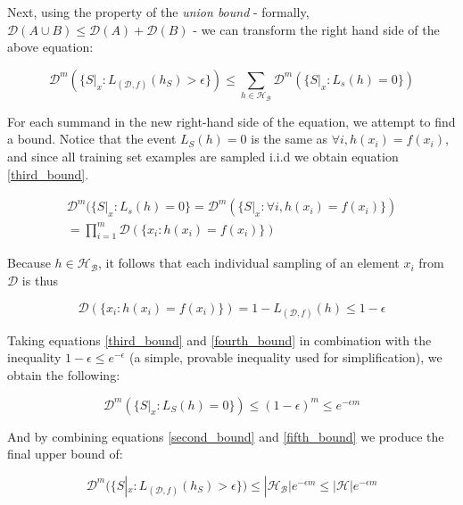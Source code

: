 \documentclass[10pt,conference]{IEEEtran}
\def\dist{\mathcal{D}}
\def\hypspace{\mathcal{H}}
\def\bad{\mathcal{B}}
\begin{document}
    Next, using the property of the \emph{union bound} - formally, $\dist (A\cup B) \leq \dist (A) + \dist (B)$ - we can transform the right hand side of the above equation\cite{shais}: 

    \begin{equation}
      \label{second_bound}
      \dist^m(\{S|_x:L_{(\dist, f)}(h_S)>\epsilon\}) \leq \sum_{h\in\hypspace_\bad} \dist^m(\{S|_x:L_s(h) = 0\})
    \end{equation}

    For each summand in the new right-hand side of the equation, we attempt to find a bound. Notice that the event $L_S(h)=0$ is the same as $\forall i, h(x_i) = f(x_i)$, and since all training set examples are sampled i.i.d we obtain equation \ref{third_bound}\cite{shais}.

    \begin{equation}
      \label{third_bound}
      \begin{aligned}
        \dist^m(\{S|_x:L_s(h) = 0\} = \dist^m(\{S|_x:\forall i, h(x_i) = f(x_i)\}) \\
        = \prod^m_{i = 1}\dist(\{x_i:h(x_i)=f(x_i)\})
      \end{aligned}
    \end{equation}

    Because $h \in \hypspace_\bad$, it follows that each individual sampling of an element $x_i$ from $\dist$ is thus\cite{shais}

    \begin{equation}
      \label{fourth_bound}
      \dist(\{x_i:h(x_i)=f(x_i)\}) = 1-L_{(\dist, f)}(h) \leq 1-\epsilon
    \end{equation}

    Taking equations \ref{third_bound} and \ref{fourth_bound} in combination with the inequality $1-\epsilon \leq e^{-\epsilon}$ (a simple, provable inequality used for simplification), we obtain the following\cite{shais}:

    \begin{equation}
      \label{fifth_bound}
      \dist^m(\{S|_x:L_S(h) =0\}) \leq (1-\epsilon)^m \leq e^{-\epsilon m}
    \end{equation}

    And by combining equations \ref{second_bound} and \ref{fifth_bound} we produce the final upper bound of\cite{shais}:

    \begin{equation}
      \label{final_bound}
      \dist^m(\{S|_x:L_{(\dist, f)}(h_S) > \epsilon \}) \leq |\hypspace_\bad | e^{-\epsilon m} \leq |\hypspace|e^{-\epsilon m}
    \end{equation}
\end{document}
